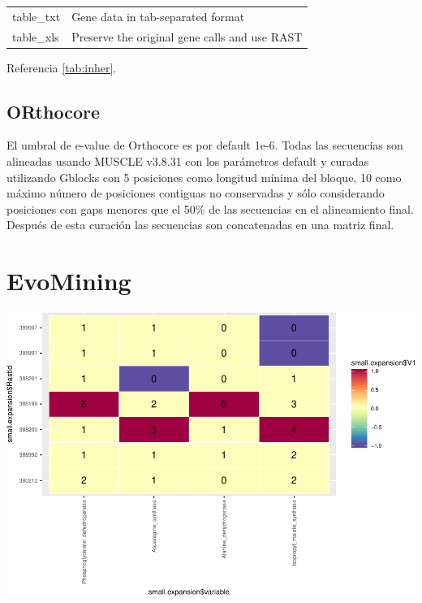 \documentclass[12pt,twoside]{reedthesis}
\begin{document}
\begin{longtable}[]{@{}ll@{}}
  \begin{minipage}[t]{0.22\columnwidth}\raggedright\strut
  table\_txt\strut
  \end{minipage} & \begin{minipage}[t]{0.72\columnwidth}\raggedright\strut
  Gene data in tab-separated format\strut
  \end{minipage}\tabularnewline
  \begin{minipage}[t]{0.22\columnwidth}\raggedright\strut
  table\_xls\strut
  \end{minipage} & \begin{minipage}[t]{0.72\columnwidth}\raggedright\strut
  Preserve the original gene calls and use RAST\strut
  \end{minipage}\tabularnewline
  \bottomrule
  \end{longtable}
  
  Referencia \autoref{tab:inher}.
  
  \section{ORthocore}\label{orthocore}
  
  El umbral de e-value de Orthocore es por default 1e-6. Todas las
  secuencias son alineadas usando MUSCLE v3.8.31 con los parámetros
  default y curadas utilizando Gblocks con 5 posiciones como longitud
  mínima del bloque, 10 como máximo número de posiciones contiguas no
  conservadas y sólo considerando posiciones con gaps menores que el 50\%
  de las secuencias en el alineamiento final. Después de esta curación las
  secuencias son concatenadas en una matriz final.
  
  \chapter{EvoMining}\label{evomining}
  
  \begin{center}\includegraphics{tesis_files/figure-latex/coloring_test_set-1} \end{center}
  
\end{document}
